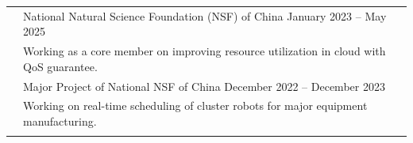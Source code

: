 \documentclass[letterpaper, 10pt]{article}
\begin{document}
\begin{longtable}{p{}p{}}
& {National Natural Science Foundation (NSF) of China} \hfill January 2023 -- May 2025 \\
& Working as a core member on improving resource utilization in cloud with QoS guarantee. \vspace{0.01\textwidth} \\

& {Major Project of National NSF of China} \hfill December 2022 -- December 2023 \\
& Working on real-time scheduling of cluster robots for major equipment manufacturing. \\
& \\



%
%




\end{longtable}
\end{document}
